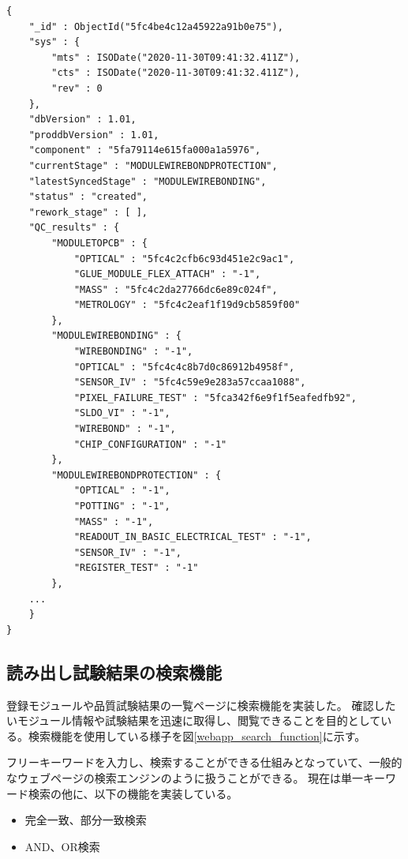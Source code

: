 \begin{lstlisting}[caption=hoge,label=fuga]
{
	"_id" : ObjectId("5fc4be4c12a45922a91b0e75"),
	"sys" : {
		"mts" : ISODate("2020-11-30T09:41:32.411Z"),
		"cts" : ISODate("2020-11-30T09:41:32.411Z"),
		"rev" : 0
	},
	"dbVersion" : 1.01,
	"proddbVersion" : 1.01,
	"component" : "5fa79114e615fa000a1a5976",
	"currentStage" : "MODULEWIREBONDPROTECTION",
	"latestSyncedStage" : "MODULEWIREBONDING",
	"status" : "created",
	"rework_stage" : [ ],
	"QC_results" : {
		"MODULETOPCB" : {
			"OPTICAL" : "5fc4c2cfb6c93d451e2c9ac1",
			"GLUE_MODULE_FLEX_ATTACH" : "-1",
			"MASS" : "5fc4c2da27766dc6e89c024f",
			"METROLOGY" : "5fc4c2eaf1f19d9cb5859f00"
		},
		"MODULEWIREBONDING" : {
			"WIREBONDING" : "-1",
			"OPTICAL" : "5fc4c4c8b7d0c86912b4958f",
			"SENSOR_IV" : "5fc4c59e9e283a57ccaa1088",
			"PIXEL_FAILURE_TEST" : "5fca342f6e9f1f5eafedfb92",
			"SLDO_VI" : "-1",
			"WIREBOND" : "-1",
			"CHIP_CONFIGURATION" : "-1"
		},
		"MODULEWIREBONDPROTECTION" : {
			"OPTICAL" : "-1",
			"POTTING" : "-1",
			"MASS" : "-1",
			"READOUT_IN_BASIC_ELECTRICAL_TEST" : "-1",
			"SENSOR_IV" : "-1",
			"REGISTER_TEST" : "-1"
		},
    ...
	}
}
\end{lstlisting}

\newpage
\subsection{読み出し試験結果の検索機能}
登録モジュールや品質試験結果の一覧ページに検索機能を実装した。
確認したいモジュール情報や試験結果を迅速に取得し、閲覧できることを目的としている。検索機能を使用している様子を図\ref{webapp_search_function}に示す。

フリーキーワードを入力し、検索することができる仕組みとなっていて、一般的なウェブページの検索エンジンのように扱うことができる。
現在は単一キーワード検索の他に、以下の機能を実装している。
\begin{itemize}
  \item 完全一致、部分一致検索
  \item AND、OR検索
\end{itemize}

